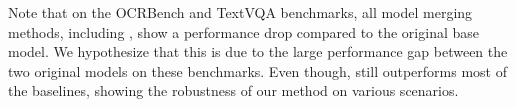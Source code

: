 
Note that on the OCRBench and TextVQA benchmarks, all model merging methods, including \ours, show a performance drop compared to the original base model.
We hypothesize that this is due to the large performance gap between the two original models on these benchmarks.
Even though, \ours still outperforms most of the baselines, showing the robustness of our method on various scenarios.


% 



 
